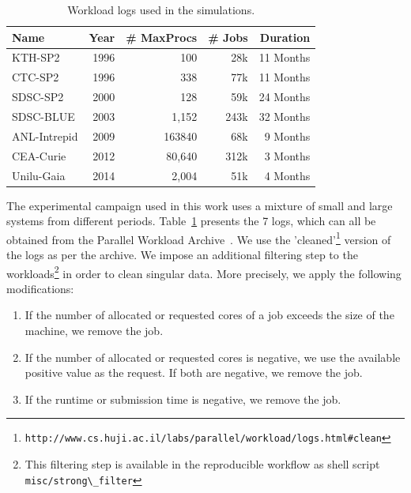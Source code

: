 \documentclass[sigconf,review]{acmart}
\newcommand{\ra}[1]{\renewcommand{\arraystretch}{#1}}
\begin{document}
\begin{table}[ht]
  \centering
  \ra{1.3}
  \caption{Workload logs used in the simulations.}
  \label{tab:logs}
  \begin{tabular}{@{}lrrrr@{}}
    \hline
    Name          & Year & \# MaxProcs & \# Jobs & Duration\\
    \hline
    KTH-SP2       & 1996 & 100         & 28k     & 11 Months\\
    CTC-SP2       & 1996 & 338         & 77k     & 11 Months\\
    SDSC-SP2      & 2000 & 128         & 59k     & 24 Months\\
    SDSC-BLUE     & 2003 & 1,152       & 243k    & 32 Months\\
    ANL-Intrepid  & 2009 & 163840      & 68k     & 9  Months\\
    CEA-Curie     & 2012 & 80,640      & 312k    & 3  Months\\
    Unilu-Gaia    & 2014 & 2,004       & 51k     & 4  Months\\
    \hline
  \end{tabular}
\end{table}

The experimental campaign used in this work uses a mixture of small and large
systems from different periods. Table~\ref{tab:logs} presents the 7 logs, which
can all be obtained from the Parallel Workload
Archive~\cite{Feitelson20142967}. We use the
'cleaned'\footnote{\lstinline[basicstyle=\ttfamily\color{blue}]|http://www.cs.huji.ac.il/labs/parallel/workload/logs.html#clean|}
version of the logs as per the archive. We impose an additional filtering step
to the workloads\footnote{This filtering step is available in the reproducible
workflow\cite{repro} as shell script
\lstinline[basicstyle=\ttfamily\color{blue}]|misc/strong\_filter|} in order to
clean singular data. More precisely, we apply the following modifications:

\begin{enumerate}

  \item If the number of allocated or requested cores of a job  exceeds the
    size of the machine, we remove the job.

  \item If the number of allocated or requested cores is negative, we use the
    available positive value as the request. If both are negative, we remove
    the job.

  \item If the runtime or submission time is negative, we remove the job.

\end{enumerate}
\end{document}
